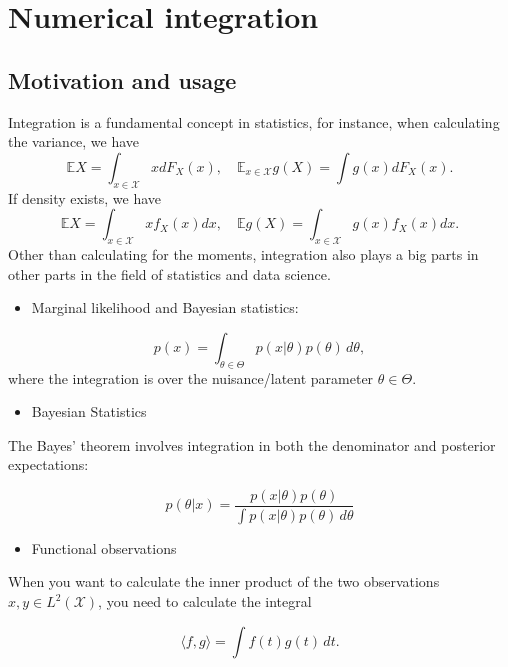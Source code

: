 \documentclass[
  letterpaper,
  DIV=11,
  numbers=noendperiod]{scrreprt}
\providecommand{\tightlist}{%
  \setlength{\itemsep}{0pt}\setlength{\parskip}{0pt}}
\begin{document}
{

\chapter{Numerical integration}\label{numerical-integration}

\newcommand{\E}{\mathbb E}
\newcommand{\X}{\mathcal X}

\section{Motivation and usage}\label{motivation-and-usage}

Integration is a fundamental concept in statistics, for instance, when
calculating the variance, we have \[
  \mathbb EX = \int_{x\in\mathcal X} x dF_X(x),\quad \mathbb E_{x\in\mathcal X} g(X) = \int g(x) dF_X(x).
\] If density exists, we have \[
\mathbb EX = \int_{x\in\mathcal X} x f_X(x) dx,\quad \mathbb Eg(X) = \int_{x\in\mathcal X} g(x) f_X(x) dx.
\] Other than calculating for the moments, integration also plays a big
parts in other parts in the field of statistics and data science.

\begin{itemize}
\tightlist
\item
  Marginal likelihood and Bayesian statistics:
\end{itemize}

\[
  p(x) = \int_{\theta\in\Theta}     p(x|\theta)p(\theta)\,d\theta,
\] where the integration is over the nuisance/latent parameter
\(\theta\in\Theta\).

\begin{itemize}
\tightlist
\item
  Bayesian Statistics
\end{itemize}

The Bayes' theorem involves integration in both the denominator and
posterior expectations:

\[
p(\theta|x) = \frac{p(x|\theta)p(\theta)}{\int p(x|\theta)p(\theta)\,d\theta}
\]

\begin{itemize}
\tightlist
\item
  Functional observations
\end{itemize}

When you want to calculate the inner product of the two observations
\(x,y\in L^2(\mathcal X)\), you need to calculate the integral

\[
\langle f,g \rangle = \int f(t)g(t)\,dt.
\]

}
\end{document}
